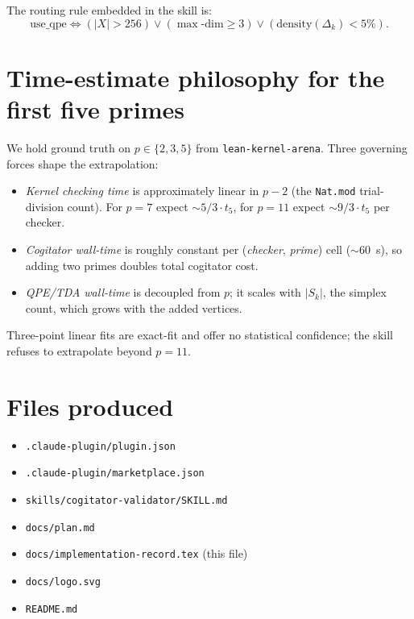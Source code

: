 \documentclass[11pt,a4paper]{article}
\begin{document}
The routing rule embedded in the skill is:
\[
\text{use\_qpe} \iff (|X| > 256) \lor (\max\text{-dim} \geq 3)
                  \lor (\text{density}(\Delta_k) < 5\%).
\]

\section{Time-estimate philosophy for the first five primes}

We hold ground truth on $p \in \{2,3,5\}$ from
\texttt{lean-kernel-arena}. Three governing forces shape the
extrapolation:

\begin{itemize}
  \item \emph{Kernel checking time} is approximately linear in
        $p - 2$ (the \texttt{Nat.mod} trial-division count). For
        $p = 7$ expect $\sim 5/3 \cdot t_5$, for $p = 11$ expect
        $\sim 9/3 \cdot t_5$ per checker.
  \item \emph{Cogitator wall-time} is roughly constant per
        (\emph{checker}, \emph{prime}) cell ($\sim 60$~s), so adding
        two primes doubles total cogitator cost.
  \item \emph{QPE/TDA wall-time} is decoupled from $p$; it scales
        with $|S_k|$, the simplex count, which grows with the
        added vertices.
\end{itemize}

Three-point linear fits are exact-fit and offer no statistical
confidence; the skill refuses to extrapolate beyond $p = 11$.

\section{Files produced}

\begin{itemize}
  \item \texttt{.claude-plugin/plugin.json}
  \item \texttt{.claude-plugin/marketplace.json}
  \item \texttt{skills/cogitator-validator/SKILL.md}
  \item \texttt{docs/plan.md}
  \item \texttt{docs/implementation-record.tex} (this file)
  \item \texttt{docs/logo.svg}
  \item \texttt{README.md}
\end{itemize}
\end{document}
